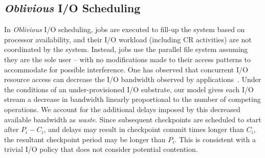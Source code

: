 \documentclass[conference,nofonttune]{IEEEtran}
\newcommand{\period}[1]{P_{#1}}
\newcommand{\ckpt}[1]{C_{#1}}
\newcommand{\dca}[1]{\todo[inline]{DCA: #1}}
\newcommand{\nocoop}{\emph{Oblivious}\xspace}
\def\propfixed{\nocoop-Fixed\xspace}
\def\propdaly{\nocoop-Daly\xspace}
\begin{document}


\subsection{\nocoop I/O Scheduling}

In \nocoop I/O scheduling, jobs are executed to fill-up the system based on
processor availability, and their I/O workload (including CR activities) are
not coordinated by the system.  Instead, jobs use the parallel file system
assuming they are the sole user -- with no modifications made to their access
patterns to accommodate for possible interference. One has observed
that concurrent I/O resource access can decrease the I/O bandwidth
observed by applications~\cite{Dorier2015}.  Under the conditions of an under-provisioned I/O
substrate, our model gives each I/O stream a decrease in bandwidth linearly
proportional to the number of competing operations.  We account for the
additional delays imposed by this decreased available bandwidth as
\emph{waste}.  Since subsequent checkpoints are scheduled to start after
$\period{i}-\ckpt{i}$, and delays may result in checkpoint commit times longer
than $\ckpt{i}$, the resultant checkpoint period may be longer than
$\period{i}$. This is consistent with a trivial I/O policy that does not
consider potential contention.

\end{document}

